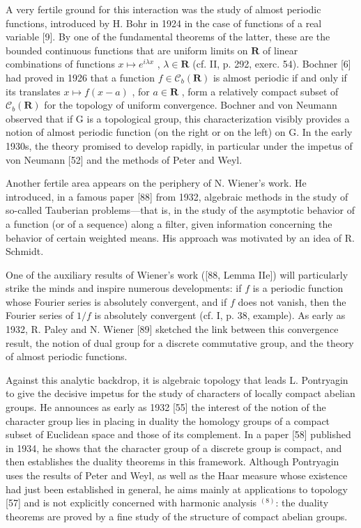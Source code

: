 A very fertile ground for this interaction was the study of almost periodic functions, introduced by H. Bohr in 1924 in the case of functions of a real variable {[}9{]}. By one of the fundamental theorems of the latter, these are the bounded continuous functions that are uniform limits on \(\mathbf{R}\) of linear combinations of functions \(x \mapsto e^{i\lambda x}\) , \(\lambda \in \mathbf{R}\) (cf. II, p. 292, exerc. 54). Bochner {[}6{]} had proved in 1926 that a function \(f \in \mathcal{C}_b(\mathbf{R})\) is almost periodic if and only if its translates \(x \mapsto f(x - a)\) , for \(a \in \mathbf{R}\) , form a relatively compact subset of \(\mathcal{C}_b(\mathbf{R})\) for the topology of uniform convergence. Bochner and von Neumann observed that if G is a topological group, this characterization visibly provides a notion of almost periodic function (on the right or on the left) on G. In the early 1930s, the theory promised to develop rapidly, in particular under the impetus of von Neumann {[}52{]} and the methods of Peter and Weyl.

Another fertile area appears on the periphery of N. Wiener's work. He introduced, in a famous paper {[}88{]} from 1932, algebraic methods in the study of so-called Tauberian problems—that is, in the study of the asymptotic behavior of a function (or of a sequence) along a filter, given information concerning the behavior of certain weighted means. His approach was motivated by an idea of R. Schmidt.

One of the auxiliary results of Wiener's work ({[}88, Lemma IIe{]}) will particularly strike the minds and inspire numerous developments: if \(f\) is a periodic function whose Fourier series is absolutely convergent, and if \(f\) does not vanish, then the Fourier series of \(1/f\) is absolutely convergent (cf. I, p. 38, example). As early as 1932, R. Paley and N. Wiener {[}89{]} sketched the link between this convergence result, the notion of dual group for a discrete commutative group, and the theory of almost periodic functions.

Against this analytic backdrop, it is algebraic topology that leads L. Pontryagin to give the decisive impetus for the study of characters of locally compact abelian groups. He announces as early as 1932 {[}55{]} the interest of the notion of the character group lies in placing in duality the homology groups of a compact subset of Euclidean space and those of its complement. In a paper {[}58{]} published in 1934, he shows that the character group of a discrete group is compact, and then establishes the duality theorems in this framework. Although Pontryagin uses the results of Peter and Weyl, as well as the Haar measure whose existence had just been established in general, he aims mainly at applications to topology {[}57{]} and is not explicitly concerned with harmonic analysis \(^{(8)}\): the duality theorems are proved by a fine study of the structure of compact abelian groups.

